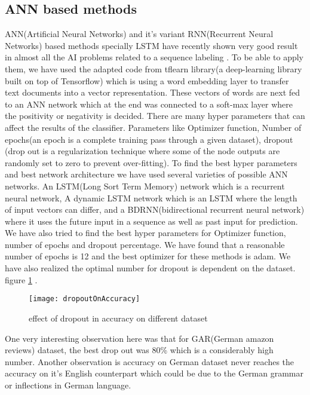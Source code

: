 	\subsection*{ANN based methods}
	ANN(Artificial Neural Networks) and it's variant RNN(Recurrent Neural Networks) based methods specially LSTM have recently shown very good result in almost all the AI problems related to a sequence labeling \cite{Graves2012} \cite{UnreasonableRNN}. To be able to apply them, we have used the adapted code from tflearn library\cite{tflearn2016}(a deep-learning library built on top of Tensorflow\cite{tensorflow2015-whitepaper}) which is using a word embedding layer to transfer text documents into a vector representation. These vectors of words are next fed to an ANN network which at the end was connected to a soft-max layer where the positivity or negativity is decided. There are many hyper parameters that can affect the results of the classifier. Parameters like Optimizer function, Number of epochs(an epoch is a complete training pass through a given dataset), dropout (drop out is a regularization technique where some of the node outputs are randomly set to zero to prevent over-fitting). To find the best hyper parameters and best network architecture we have used several varieties of possible ANN networks. An LSTM(Long Sort Term Memory) network which is a recurrent neural network, A dynamic LSTM network which is an LSTM where the length of input vectors can differ, and a BDRNN(bidirectional recurrent neural network) where it uses the future input in a sequence as well as past input for prediction. We have also tried to find the best hyper parameters for Optimizer function, number of epochs and dropout percentage. We have found that a reasonable number of epochs is 12 and the best optimizer for these methods is adam. We have also realized the optimal number for dropout is dependent on the dataset. figure \ref{fig:dropoutOnAccuracy} .
	\begin{figure}[!ht]
		\centering
		\texttt{[image: dropoutOnAccuracy]}
		\caption{effect of dropout in accuracy on different dataset}
		\label{fig:dropoutOnAccuracy}
	\end{figure}
	One very interesting observation here was that for GAR(German amazon reviews) dataset, the best drop out was 80\% which is a considerably high number. Another observation is accuracy on German dataset never reaches the accuracy on it's English counterpart which could be due to the German grammar or inflections in German language.
